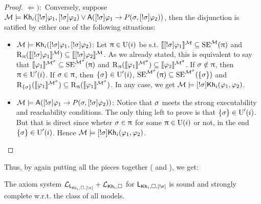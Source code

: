 \begin{proof}
$\Leftarrow):$ Conversely, suppose $\modults \models \khi(\srefbox{\plan} \varphi_1,\srefbox{\plan} \varphi_2) \vee \A(\srefbox{\plan} \varphi_1 \ra P(\plan,\srefbox{\plan}\varphi_2))$, then the disjunction is satified by either one of the following situations:
\begin{itemize}
\item  $\modults \models \khi(\srefbox{\plan} \varphi_1,\srefbox{\plan} \varphi_2)$: Let $\plans \in \Unc(i)$ be s.t. $\truthset{\modults}{\srefbox{\plan}\varphi_1} \subseteq \stexec^\modults(\plans)$ and $\R_\plans(\truthset{\modults}{\srefbox{\plan}\varphi_1}) \subseteq \truthset{\modults}{\srefbox{\plan}\varphi_2}$.
As we already stated, this is equivalent to say that $\truthset{\modults^\plan}{\varphi_1} \subseteq \stexec^{\modults^\plan}(\plans)$ and $\R_\plans(\truthset{\modults^\plan}{\varphi_1}) \subseteq \truthset{\modults^\plan}{\varphi_2}$.
If $\plan \notin \plans$, then $\plans \in \Unc'(i)$.
If $\plan \in \plans$, then $\set{\plan} \in \Unc'(i)$, $\stexec^{\modults^\plan}(\plans) \subseteq \stexec^{\modults^\plan}(\set{\plan})$ and $\R_{\set{\plan}}(\truthset{\modults^\plan}{\varphi_1}) \subseteq \R_\plans(\truthset{\modults^\plan}{\varphi_1})$. In any case, we get $\modults \models \srefbox{\plan}\khi(\varphi_1,\varphi_2)$.

\item $\modults \models \A(\srefbox{\plan} \varphi_1 \ra P(\plan,\srefbox{\plan}\varphi_2))$: Notice that $\plan$ meets the strong executability and reachability conditions.
The only thing left to prove is that $\set{\plan} \in \Unc'(i)$. But that is direct since wheter $\plan \in \plans$ for some $\plans \in \Unc(i)$ or not, in the end $\set{\plan} \in \Unc'(i)$. Hence $\modults \models \srefbox{\plan}\khi(\varphi_1,\varphi_2)$.
\end{itemize}
\end{proof}

Thus, by again putting all the pieces together ( and ), we get:

\medskip 

\begin{theorem}
The axiom system $\axset_{\PlanReflogic}+\axset_{\khi,\square}$ for $\PlanReflogic$ is sound and strongly complete w.r.t. the class of all models.
\end{theorem}

\medskip 


